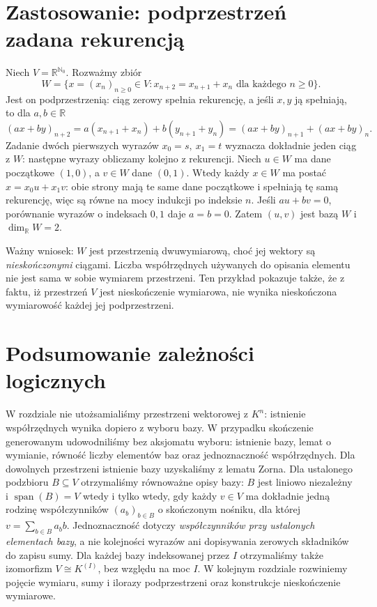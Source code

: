 \section{Zastosowanie: podprzestrzeń zadana rekurencją}
\label{sec:lin-przyklad-rekurencja}

\begin{przyklad}
\label{prz:lin-rekurencja}
Niech \(V=\mathbb R^{\mathbb N_0}\).
Rozważmy zbiór
\[
 W=\{x=(x_n)_{n\geq0}\in V:
                   x_{n+2}=x_{n+1}+x_n
                   \text{ dla każdego }n\geq0\}.
\]
Jest on podprzestrzenią: ciąg zerowy spełnia
rekurencję, a jeśli \(x,y\) ją spełniają,
to dla \(a,b\in\mathbb R\)
\[
 (ax+by)_{n+2}
 =a(x_{n+1}+x_n)+b(y_{n+1}+y_n)
 =(ax+by)_{n+1}+(ax+by)_n .
\]
Zadanie dwóch pierwszych wyrazów
\(x_0=s,\ x_1=t\) wyznacza dokładnie
jeden ciąg z \(W\): następne wyrazy
obliczamy kolejno z rekurencji.
Niech \(u\in W\) ma dane początkowe
\((1,0)\), a \(v\in W\) dane \((0,1)\).
Wtedy każdy \(x\in W\) ma postać
\(x=x_0u+x_1v\): obie strony mają te
same dane początkowe i spełniają
tę samą rekurencję, więc są równe
na mocy indukcji po indeksie \(n\).
Jeśli \(au+bv=0\), porównanie wyrazów
o indeksach \(0,1\) daje \(a=b=0\).
Zatem \((u,v)\) jest bazą \(W\)
i \(\dim_{\mathbb R}W=2\).

Ważny wniosek: \(W\) jest przestrzenią
dwuwymiarową, choć jej wektory są
\emph{nieskończonymi} ciągami.
Liczba współrzędnych używanych do
opisania elementu nie jest sama
w sobie wymiarem przestrzeni.
Ten przykład pokazuje także, że z faktu,
iż przestrzeń \(V\) jest nieskończenie wymiarowa,
nie wynika nieskończona wymiarowość każdej
jej podprzestrzeni.
\end{przyklad}

\section{Podsumowanie zależności logicznych}
\label{sec:lin-podsumowanie}

W rozdziale nie utożsamialiśmy przestrzeni
wektorowej z \(K^n\): istnienie współrzędnych
wynika dopiero z wyboru bazy.
W przypadku skończenie generowanym
udowodniliśmy bez aksjomatu wyboru:
istnienie bazy, lemat o wymianie,
równość liczby elementów baz oraz
jednoznaczność współrzędnych.
Dla dowolnych przestrzeni
istnienie bazy uzyskaliśmy z lematu Zorna.
Dla ustalonego podzbioru \(B\subseteq V\)
otrzymaliśmy równoważne opisy bazy:
\(B\) jest liniowo niezależny i
\(\operatorname{span}(B)=V\) wtedy i tylko wtedy,
gdy każdy \(v\in V\) ma dokładnie jedną
rodzinę współczynników
\((a_b)_{b\in B}\) o skończonym nośniku,
dla której \(v=\sum_{b\in B}a_bb\).
Jednoznaczność dotyczy \emph{współczynników
przy ustalonych elementach bazy}, a nie
kolejności wyrazów ani dopisywania zerowych
składników do zapisu sumy.
Dla każdej bazy indeksowanej przez \(I\)
otrzymaliśmy także izomorfizm
\(V\cong K^{(I)}\), bez względu na moc \(I\).
W kolejnym rozdziale rozwiniemy pojęcie wymiaru,
sumy i ilorazy podprzestrzeni oraz
konstrukcje nieskończenie wymiarowe.
